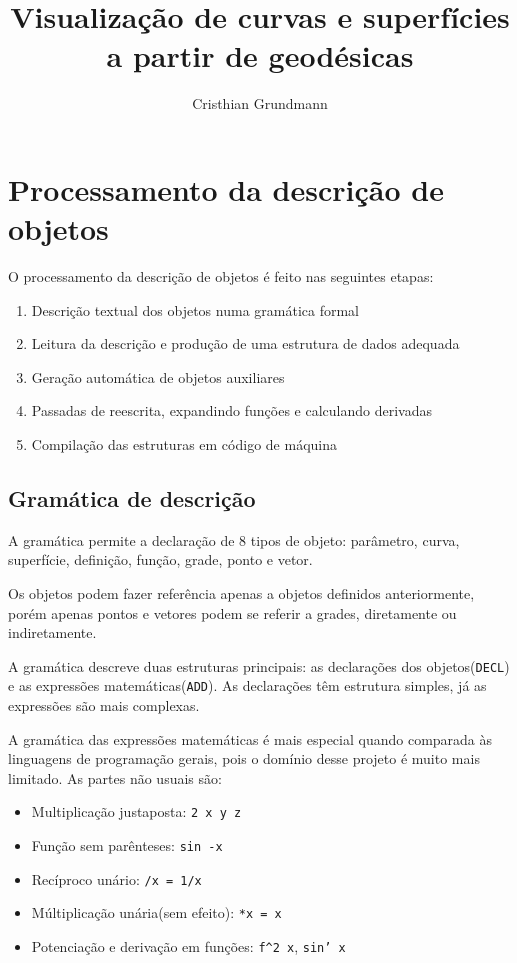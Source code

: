 \documentclass[10pt,a4paper,final]{article}
\author{Cristhian Grundmann}
\title{Visualização de curvas e superfícies a partir de geodésicas}
\begin{document}
\maketitle


\section{Processamento da descrição de objetos}
O processamento da descrição de objetos é feito nas seguintes etapas:

\begin{enumerate}
	\item Descrição textual dos objetos numa gramática formal
	\item Leitura da descrição e produção de uma estrutura de dados adequada
	\item Geração automática de objetos auxiliares
	\item Passadas de reescrita, expandindo funções e calculando derivadas
	\item Compilação das estruturas em código de máquina
\end{enumerate}

\subsection{Gramática de descrição}
A gramática permite a declaração de 8 tipos de objeto: parâmetro, curva, superfície, definição, função, grade, ponto e vetor.

Os objetos podem fazer referência apenas a objetos definidos anteriormente, porém apenas pontos e vetores podem se referir a grades, diretamente ou indiretamente.

A gramática descreve duas estruturas principais: as declarações dos objetos(\texttt{DECL}) e as expressões matemáticas(\texttt{ADD}). As declarações têm estrutura simples, já as expressões são mais complexas.

A gramática das expressões matemáticas é mais especial quando comparada às linguagens de programação gerais, pois o domínio desse projeto é muito mais limitado. As partes não usuais são:

\begin{itemize}
\item Multiplicação justaposta: \texttt{2 x y z}
\item Função sem parênteses: \texttt{sin -x}
\item Recíproco unário: \texttt{/x = 1/x}
\item Múltiplicação unária(sem efeito): \texttt{*x = x}
\item Potenciação e derivação em funções: \texttt{f\textasciicircum 2 x}, \texttt{sin' x}
\end{itemize}
\end{document}
